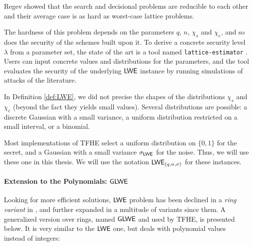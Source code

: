 Regev showed that the search and decisional problems are reducible to each other and their average case is as hard as worst-case lattice problems.

The hardness of this problem depends on the parameters $q$, $n$, $\chi_s$ and $\chi_e$, and so does the security of the schemes built upon it. To derive a concrete security level $\lambda$ from a parameter set, the state of the art is a tool named \texttt{lattice-estimator} \cite{lattice-estimator}. Users can input concrete values and distributions for the parameters, and the tool evaluates the security of the underlying $\textsf{LWE}$ instance by running simulations of attacks of the literature.

In Definition \ref{def:LWE}, we did not precise the shapes of the distributions $\chi_s$ and $\chi_e$ (beyond the fact they yields small values). Several distributions are possible: a discrete Gaussian with a small variance, a uniform distribution restricted on a small interval, or a binomial. 

Most implementations of TFHE select a uniform distribution on $\{0, 1\}$ for the secret, and a Gaussian with a small variance $\sigma_{\textsf{LWE}}$ for the noise. Thus, we will use these one in this thesis. We will use the notation $\textsf{LWE}_{(q, n, \sigma)}$ for these instances.



\paragraph{Extension to the Polynomials: $\textsf{GLWE}$}


Looking for more efficient solutions, $\textsf{LWE}$ problem has been declined in a \textit{ring variant} in \cite{rlwe}, and further expanded in a multitude of variants since them. A generalized version over rings, named $\textsf{GLWE}$ and used by TFHE, is presented below. It is very similar to the $\textsf{LWE}$ one, but deals with polynomial values instead of integers:

